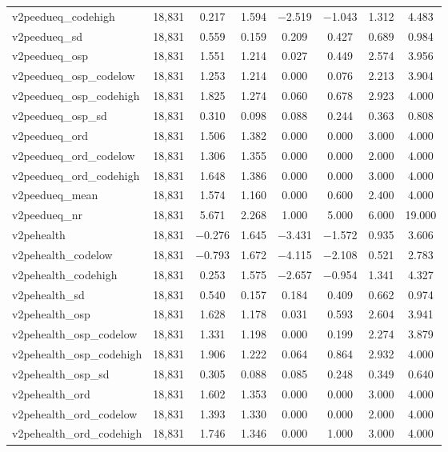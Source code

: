 \begin{table}[!htbp]
\begin{tabular}{@{\extracolsep{5pt}}lccccccc}
v2peedueq\_codehigh & 18,831 & 0.217 & 1.594 & $-$2.519 & $-$1.043 & 1.312 & 4.483 \\ 
v2peedueq\_sd & 18,831 & 0.559 & 0.159 & 0.209 & 0.427 & 0.689 & 0.984 \\ 
v2peedueq\_osp & 18,831 & 1.551 & 1.214 & 0.027 & 0.449 & 2.574 & 3.956 \\ 
v2peedueq\_osp\_codelow & 18,831 & 1.253 & 1.214 & 0.000 & 0.076 & 2.213 & 3.904 \\ 
v2peedueq\_osp\_codehigh & 18,831 & 1.825 & 1.274 & 0.060 & 0.678 & 2.923 & 4.000 \\ 
v2peedueq\_osp\_sd & 18,831 & 0.310 & 0.098 & 0.088 & 0.244 & 0.363 & 0.808 \\ 
v2peedueq\_ord & 18,831 & 1.506 & 1.382 & 0.000 & 0.000 & 3.000 & 4.000 \\ 
v2peedueq\_ord\_codelow & 18,831 & 1.306 & 1.355 & 0.000 & 0.000 & 2.000 & 4.000 \\ 
v2peedueq\_ord\_codehigh & 18,831 & 1.648 & 1.386 & 0.000 & 0.000 & 3.000 & 4.000 \\ 
v2peedueq\_mean & 18,831 & 1.574 & 1.160 & 0.000 & 0.600 & 2.400 & 4.000 \\ 
v2peedueq\_nr & 18,831 & 5.671 & 2.268 & 1.000 & 5.000 & 6.000 & 19.000 \\ 
v2pehealth & 18,831 & $-$0.276 & 1.645 & $-$3.431 & $-$1.572 & 0.935 & 3.606 \\ 
v2pehealth\_codelow & 18,831 & $-$0.793 & 1.672 & $-$4.115 & $-$2.108 & 0.521 & 2.783 \\ 
v2pehealth\_codehigh & 18,831 & 0.253 & 1.575 & $-$2.657 & $-$0.954 & 1.341 & 4.327 \\ 
v2pehealth\_sd & 18,831 & 0.540 & 0.157 & 0.184 & 0.409 & 0.662 & 0.974 \\ 
v2pehealth\_osp & 18,831 & 1.628 & 1.178 & 0.031 & 0.593 & 2.604 & 3.941 \\ 
v2pehealth\_osp\_codelow & 18,831 & 1.331 & 1.198 & 0.000 & 0.199 & 2.274 & 3.879 \\ 
v2pehealth\_osp\_codehigh & 18,831 & 1.906 & 1.222 & 0.064 & 0.864 & 2.932 & 4.000 \\ 
v2pehealth\_osp\_sd & 18,831 & 0.305 & 0.088 & 0.085 & 0.248 & 0.349 & 0.640 \\ 
v2pehealth\_ord & 18,831 & 1.602 & 1.353 & 0.000 & 0.000 & 3.000 & 4.000 \\ 
v2pehealth\_ord\_codelow & 18,831 & 1.393 & 1.330 & 0.000 & 0.000 & 2.000 & 4.000 \\ 
v2pehealth\_ord\_codehigh & 18,831 & 1.746 & 1.346 & 0.000 & 1.000 & 3.000 & 4.000 \\ 

\end{tabular}
\end{table}
